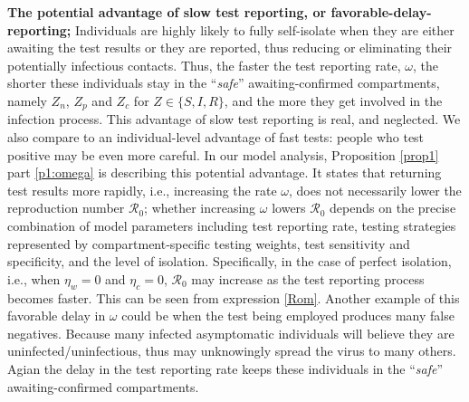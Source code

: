 \documentclass[12pt]{article}
\newcommand{\Rnum}{\mathcal{R}_0}
\theoremstyle{definition} %
\begin{document}
{\bf The potential advantage of slow test reporting, or favorable-delay-reporting;}
Individuals are highly likely to fully self-isolate when they are either awaiting the test results or they are reported, thus reducing or eliminating their potentially infectious contacts. Thus, the faster the test reporting rate, $\omega$, the shorter these individuals stay in the ``\emph {safe}'' awaiting-confirmed compartments, namely $Z_n$, $Z_p$ and $Z_c$ for $Z \in \{S,I,R\}$, and the more they get involved in the infection process.
This advantage of slow test reporting is real, and neglected. 
We also compare to an individual-level advantage of fast tests: people who test positive may be even more careful.
In our model analysis, Proposition \ref{prop1} part \ref{p1:omega} is describing this potential advantage. 
It states that returning test results more rapidly, i.e., increasing the rate $\omega$, does not necessarily lower the reproduction number $\Rnum$; whether increasing $\omega$ lowers $\Rnum$ depends on the precise combination of model parameters  including test reporting rate, testing strategies represented by compartment-specific testing weights, test sensitivity and specificity, and the level of isolation. 
Specifically, in the case of perfect isolation, i.e., when $\eta_w=0$ and $\eta_c=0$, $\Rnum$ may increase as the test reporting process becomes faster. This can be seen from expression \eqref{Rom}.
Another example of this favorable delay in $\omega$ could be when the test being employed produces many false negatives. Because many infected asymptomatic individuals will believe they are uninfected/uninfectious, thus may unknowingly spread the virus to many others. Agian the delay in the test reporting rate keeps these individuals in the ``\emph {safe}'' awaiting-confirmed compartments.  
\end{document}
